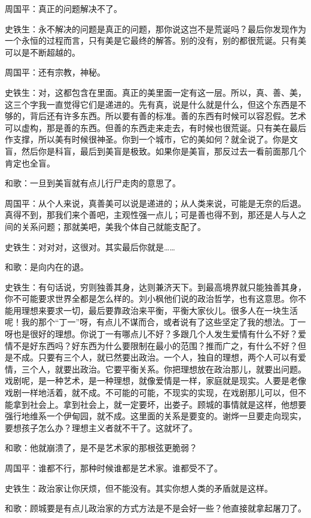 \documentclass[12pt,a5paper]{ctexbook}
\begin{document}
周国平：真正的问题解决不了。

史铁生：永不解决的问题是真正的问题，那你说这岂不是荒诞吗？最后你发现作为一个永恒的过程而言，只有美是它最终的解答。别的没有，别的都很荒诞。只有美可以是不断超越的。

周国平：还有宗教，神秘。

史铁生：对，这都包含在里面。真正的美里面一定有这一层。所以，真、善、美，这三个字我一直觉得它们是递进的。先有真，说是什么就是什么，但这个东西是不够的，背后还有许多东西。所以要有善的标准。善的东西有时候可以容忍假。艺术可以虚构，那是善的东西。但善的东西走来走去，有时候也很荒诞。只有美在最后作支撑，所以美有时候很神圣。你到一个城市，它的美如何？就全说了。你是文盲，然后你是科盲，最后到美盲是极致。如果你是美盲，那反过去一看前面那几个肯定也全盲。

和歌：一旦到美盲就有点儿行尸走肉的意思了。

周国平：从个人来说，真善美可以说是递进的；从人类来说，可能是无奈的后退。真得不到，那我们来个善吧，主观性强一点儿；可是善也得不到，那还是人与人之间的关系问题；那就美吧，美我个体自己就能支配了。

史铁生：对对对，这很对。其实最后你就是……

和歌：是向内在的退。

史铁生：有句话说，穷则独善其身，达则兼济天下。到最高境界就只能独善其身，你不可能要求世界全都是怎么样的。刘小枫他们说的政治哲学，也有这意思。你不能用理想来要求一切，最后要靠政治来平衡，平衡大家伙儿。很多人在一块生活呢！我的那个“丁一”呀，有点儿不谋而合，或者说有了这些坚定了我的想法。丁一呀也是很好的理想。你说丁一有哪点儿不好？多跟几个人发生爱情有什么不好？爱情不是好东西吗？好东西为什么要限制在最小的范围？推而广之，有什么不好？但是不成。只要有三个人，就已然要出政治。一个人，独自的理想，两个人可以有爱情，三个人，就要出政治。它要平衡关系。你把理想放在政治那儿，就要出问题。戏剧呢，是一种艺术，是一种理想，就像爱情是一样，家庭就是现实。人要是老像戏剧一样地活着，就不成。不可能的可能，不现实的实现，在戏剧那儿可以，但不能拿到社会上。拿到社会上，就一定要坏，出娄子。顾城的事情就是这样，他想要强行地维系一个伊甸园，就不成。这里面的关系是要变的。谢烨一旦要走向现实，要想孩子怎么办？理想主义者就不干了。这就坏了。

和歌：他就崩溃了，是不是艺术家的那根弦更脆弱？

周国平：谁都不行，那种时候谁都是艺术家。谁都受不了。

史铁生：政治家让你厌烦，但不能没有。其实你想人类的矛盾就是这样。

和歌：顾城要是有点儿政治家的方式方法是不是会好一些？他直接就拿起屠刀了。
\end{document}
